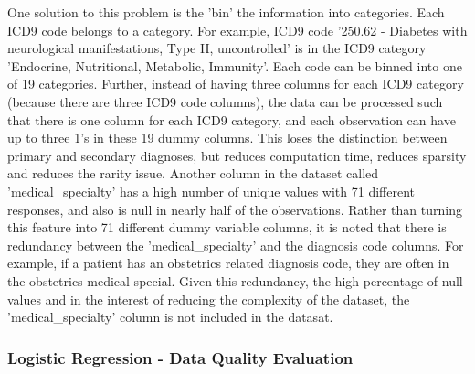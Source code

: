 \documentclass[sigconf]{acmart}
\begin{document}
One solution to this problem is the 'bin' the information into categories. Each ICD9 code belongs to a category. For example, ICD9 code '250.62 - Diabetes with neurological manifestations, Type II, uncontrolled' is in the ICD9 category 'Endocrine, Nutritional, Metabolic, Immunity'. Each code can be binned into one of 19 categories. Further, instead of having three columns for each ICD9 category (because there are three ICD9 code columns), the data can be processed such that there is one column for each ICD9 category, and each observation can have up to three 1's in these 19 dummy columns. This loses the distinction between primary and secondary diagnoses, but reduces computation time, reduces sparsity and reduces the rarity issue.
Another column in the dataset called 'medical\_specialty' has a high number of unique values with 71 different responses, and also is null in nearly half of the observations. Rather than turning this feature into 71 different dummy variable columns, it is noted that there is redundancy between the 'medical\_specialty' and the diagnosis code columns. For example, if a patient has an obstetrics related diagnosis code, they are often in the obstetrics medical special. Given this redundancy, the high percentage of null values and in the interest of reducing the complexity of the dataset, the 'medical\_specialty' column is not included in the datasat.

\subsubsection{Logistic Regression - Data Quality Evaluation}
\end{document}
